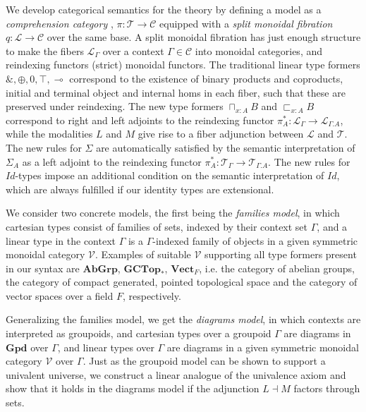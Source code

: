 \documentclass[a4paper,english]{lipics-v2018}
\begin{document}
We develop categorical semantics for the theory by defining a model as a \textit{comprehension category} \cite{jacobs}, $\pi : \mathcal{T} \to \mathcal{C}$ equipped with a \textit{split monoidal fibration} $q : \mathcal{L} \to \mathcal{C}$ over the same base. A split monoidal fibration has just enough structure to make the fibers $\mathcal{L}_\Gamma$ over a context $\Gamma \in \mathcal{C}$ into monoidal categories, and reindexing functors (strict) monoidal functors. The traditional linear type formers $\&, \oplus, 0, \top, \multimap$ correspond to the existence of binary products and coproducts, initial and terminal object and internal homs in each fiber, such that these are preserved under reindexing. The new type formers $\sqcap_{x : A}B$ and $\sqsubset_{x :A}B$ correspond to right and left adjoints to the reindexing functor $\pi_A^* : \mathcal{L}_{\Gamma} \to \mathcal{L}_{\Gamma.A}$, while the modalities $L$ and $M$ give rise to a fiber adjunction between $\mathcal{L}$ and $\mathcal{T}$. The new rules for $\Sigma$ are automatically satisfied by the semantic interpretation of $\Sigma_A$ as a left adjoint to the reindexing functor $\pi_A^* : \mathcal{T}_\Gamma \to \mathcal{T}_{\Gamma.A}$. The new rules for $Id$-types impose an additional condition on the semantic interpretation of $Id$, which are always fulfilled if our identity types are extensional.

We consider two concrete models, the first being the \textit{families model}, in which cartesian types consist of families of sets, indexed by their context set $\Gamma$, and a linear type in the context $\Gamma$ is a $\Gamma$-indexed family of objects in a given symmetric monoidal category $\mathcal{V}$. Examples of suitable $\mathcal{V}$ supporting all type formers present in our syntax are $\mathbf{AbGrp}$, $\mathbf{GCTop}_*$, $\mathbf{Vect}_F$, i.e. the category of abelian groups, the category of compact generated, pointed topological space and the category of vector spaces over a field $F$, respectively.

Generalizing the families model, we get the \textit{diagrams model}, in which contexts are interpreted as groupoids, and cartesian types over a groupoid $\Gamma$ are diagrams in $\mathbf{Gpd}$ over $\Gamma$, and linear types over $\Gamma$ are diagrams in a given symmetric monoidal category $\mathcal{V}$ over $\Gamma$. Just as the groupoid model \cite{hofmann1998} can be shown to support a univalent universe, we construct a linear analogue of the univalence axiom and show that it holds in the diagrams model if the adjunction $L \dashv M$ factors through sets.
\end{document}
